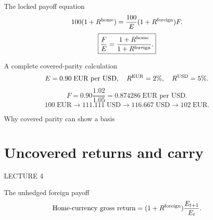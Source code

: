 \documentclass[12pt,aspectratio=169]{beamer}
\begin{document}

\begin{frame}{The locked payoff equation}
\[100(1+R^{\rm home})=\frac{100}{E}(1+R^{\rm foreign})F.\]\[\boxed{\frac{F}{E}=\frac{1+R^{\rm home}}{1+R^{\rm foreign}}.}\]
\end{frame}


\begin{frame}{A complete covered-parity calculation}
\[E=0.90\;\text{EUR per USD},\quad R^{\rm EUR}=2\%,\quad R^{\rm USD}=5\%.\]\[F=0.90\frac{1.02}{1.05}=0.874286\;\text{EUR per USD}.\]\[100\;\text{EUR}\to111.111\;\text{USD}\to116.667\;\text{USD}\to102\;\text{EUR}.\]
\end{frame}


\begin{frame}{Why covered parity can show a basis}
\end{frame}

\section[Uncovered returns and carry]{Uncovered returns and carry}
\begin{frame}[plain]
{\color{Gold}\large LECTURE 4}\par\vspace{9mm}{\Huge\bfseries Uncovered returns and carry}\par\vspace{7mm}{\Large What changes when the future conversion rate is uncertain?}
\end{frame}


\begin{frame}{The unhedged foreign payoff}
\[\text{Home-currency gross return}=(1+R^{\rm foreign})\frac{E_{t+1}}{E_t}.\]
\end{frame}
\end{document}
